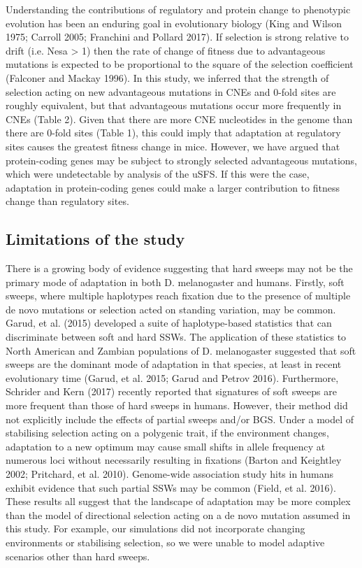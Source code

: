 Understanding the contributions of regulatory and protein change to phenotypic evolution has been an enduring goal in evolutionary biology (King and Wilson 1975; Carroll 2005; Franchini and Pollard 2017). If selection is strong relative to drift (i.e. Nesa > 1) then the rate of change of fitness due to advantageous mutations is expected to be proportional to the square of the selection coefficient (Falconer and Mackay 1996). In this study, we inferred that the strength of selection acting on new advantageous mutations in CNEs and 0-fold sites are roughly equivalent, but that advantageous mutations occur more frequently in CNEs (Table 2). Given that there are more CNE nucleotides in the genome than there are 0-fold sites (Table 1), this could imply that adaptation at regulatory sites causes the greatest fitness change in mice. However, we have argued that protein-coding genes may be subject to strongly selected advantageous mutations, which were undetectable by analysis of the uSFS. If this were the case, adaptation in protein-coding genes could make a larger contribution to fitness change than regulatory sites. 

\subsection{Limitations of the study}

There is a growing body of evidence suggesting that hard sweeps may not be the primary mode of adaptation in both D. melanogaster and humans. Firstly, soft sweeps, where multiple haplotypes reach fixation due to the presence of multiple de novo mutations or selection acted on standing variation, may be common. Garud, et al. (2015) developed a suite of haplotype-based statistics that can discriminate between soft and hard SSWs. The application of these statistics to North American and Zambian populations of D. melanogaster suggested that soft sweeps are the dominant mode of adaptation in that species, at least in recent evolutionary time (Garud, et al. 2015; Garud and Petrov 2016). Furthermore, Schrider and Kern (2017) recently reported that signatures of soft sweeps are more frequent than those of hard sweeps in humans. However, their method did not explicitly include the effects of partial sweeps and/or BGS. Under a model of stabilising selection acting on a polygenic trait, if the environment changes, adaptation to a new optimum may cause small shifts in allele frequency at numerous loci without necessarily resulting in fixations (Barton and Keightley 2002; Pritchard, et al. 2010). Genome-wide association study hits in humans exhibit evidence that such partial SSWs may be common (Field, et al. 2016). These results all suggest that the landscape of adaptation may be more complex than the model of directional selection acting on a de novo mutation assumed in this study. For example, our simulations did not incorporate changing environments or stabilising selection, so we were unable to model adaptive scenarios other than hard sweeps. 

